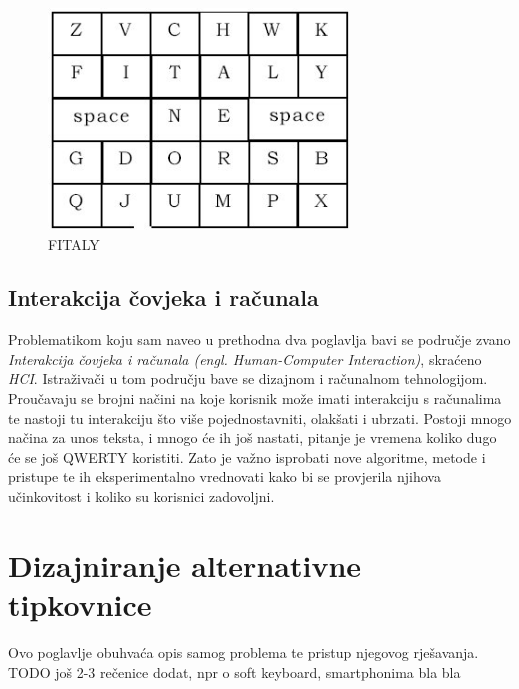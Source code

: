 \documentclass[times, utf8, zavrsni]{fer}
\begin{document}
\begin{figure}[htb]
\centering
\includegraphics[width=8cm]{img/fitaly.jpg}
\caption{FITALY}
\label{fig:fitaly}
\end{figure}

\clearpage

\section{Interakcija čovjeka i računala}
Problematikom koju sam naveo u prethodna dva poglavlja bavi se područje zvano \emph{Interakcija čovjeka i računala (engl. Human-Computer Interaction)}, skraćeno \emph{HCI}. Istraživači u tom području bave se dizajnom i računalnom tehnologijom. Proučavaju se brojni načini na koje korisnik može imati interakciju s računalima te nastoji tu interakciju što više pojednostavniti, olakšati i ubrzati. Postoji mnogo načina za unos teksta, i mnogo će ih još nastati, pitanje je vremena koliko dugo će se još QWERTY koristiti. Zato je važno isprobati nove algoritme, metode i pristupe te ih eksperimentalno vrednovati kako bi se provjerila njihova učinkovitost i koliko su korisnici zadovoljni.

\chapter{Dizajniranje alternativne tipkovnice}
Ovo poglavlje obuhvaća opis samog problema te pristup njegovog rješavanja. TODO još 2-3 rečenice dodat, npr o soft keyboard, smartphonima bla bla
\end{document}
